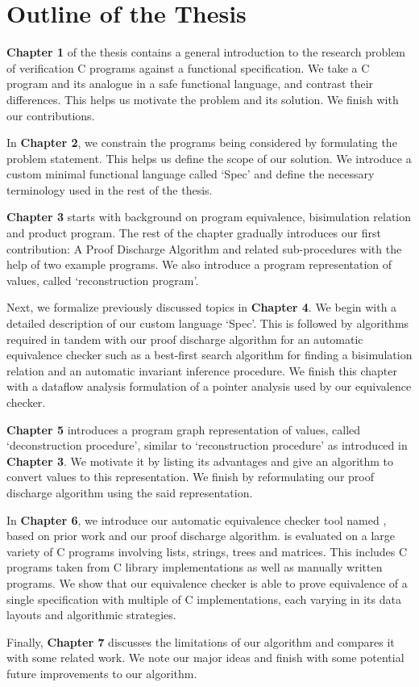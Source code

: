 \vspace{-12px}
\section{Outline of the Thesis}
\vspace{-10px}
\label{sec:outlinethesis}
\textbf{Chapter 1} of the thesis contains a general introduction to the research problem of verification C programs against a functional specification.
We take a C program and its analogue in a safe functional language, and contrast their differences. This helps us motivate the problem and its solution.
We finish with our contributions.

In \textbf{Chapter 2}, we constrain the programs being considered by formulating the problem statement. This helps us define the scope of our solution.
We introduce a custom minimal functional language called `Spec' and define the necessary terminology used in the rest of the thesis.

\textbf{Chapter 3} starts with background on program equivalence, bisimulation relation and product program.
The rest of the chapter gradually introduces our first contribution: A Proof Discharge Algorithm and related sub-procedures with the help
of two example programs. We also introduce a program representation of values, called `reconstruction program'.

Next, we formalize previously discussed topics in \textbf{Chapter 4}. We begin with a detailed description of our custom language `Spec'. This is followed by
algorithms required in tandem with our proof discharge algorithm for an automatic equivalence checker such as a best-first search algorithm
for finding a bisimulation relation and an automatic invariant inference procedure. We finish this chapter with a dataflow analysis formulation
of a pointer analysis used by our equivalence checker.

\textbf{Chapter 5} introduces a program graph representation of values, called `deconstruction procedure', similar to `reconstruction procedure' as introduced in \textbf{Chapter 3}.
We motivate it by listing its advantages and give an algorithm to convert values to this representation. We finish by reformulating our
proof discharge algorithm using the said representation.

In \textbf{Chapter 6}, we introduce our automatic equivalence checker tool named \toolName{}, based on prior work and our proof discharge algorithm.
\toolName{} is evaluated on a large variety of C programs involving lists, strings, trees and matrices.
This includes C programs taken from C library implementations as well as manually written programs. We show that our equivalence checker is able
to prove equivalence of a single specification with multiple of C implementations, each varying in its data layouts and algorithmic
strategies.

Finally, \textbf{Chapter 7} discusses the limitations of our algorithm and compares it with some related work. We note our major ideas and finish with
some potential future improvements to our algorithm.